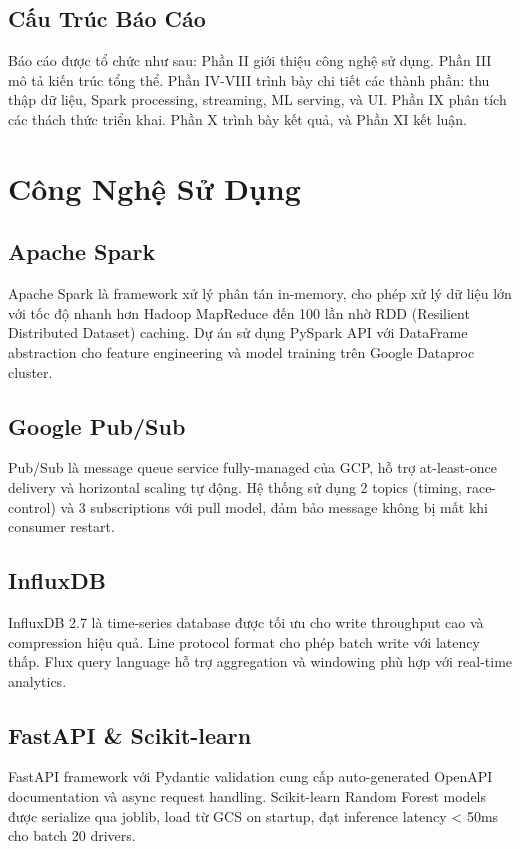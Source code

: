 \documentclass[conference,10pt]{IEEEtran}
\begin{document}
\subsection{Cấu Trúc Báo Cáo}
Báo cáo được tổ chức như sau: Phần II giới thiệu công nghệ sử dụng. Phần III mô tả kiến trúc tổng thể. Phần IV-VIII trình bày chi tiết các thành phần: thu thập dữ liệu, Spark processing, streaming, ML serving, và UI. Phần IX phân tích các thách thức triển khai. Phần X trình bày kết quả, và Phần XI kết luận.

\section{Công Nghệ Sử Dụng}

\subsection{Apache Spark}
Apache Spark là framework xử lý phân tán in-memory, cho phép xử lý dữ liệu lớn với tốc độ nhanh hơn Hadoop MapReduce đến 100 lần nhờ RDD (Resilient Distributed Dataset) caching. Dự án sử dụng PySpark API với DataFrame abstraction cho feature engineering và model training trên Google Dataproc cluster.

\subsection{Google Pub/Sub}
Pub/Sub là message queue service fully-managed của GCP, hỗ trợ at-least-once delivery và horizontal scaling tự động. Hệ thống sử dụng 2 topics (timing, race-control) và 3 subscriptions với pull model, đảm bảo message không bị mất khi consumer restart.

\subsection{InfluxDB}
InfluxDB 2.7 là time-series database được tối ưu cho write throughput cao và compression hiệu quả. Line protocol format cho phép batch write với latency thấp. Flux query language hỗ trợ aggregation và windowing phù hợp với real-time analytics.

\subsection{FastAPI \& Scikit-learn}
FastAPI framework với Pydantic validation cung cấp auto-generated OpenAPI documentation và async request handling. Scikit-learn Random Forest models được serialize qua joblib, load từ GCS on startup, đạt inference latency < 50ms cho batch 20 drivers.
\end{document}
